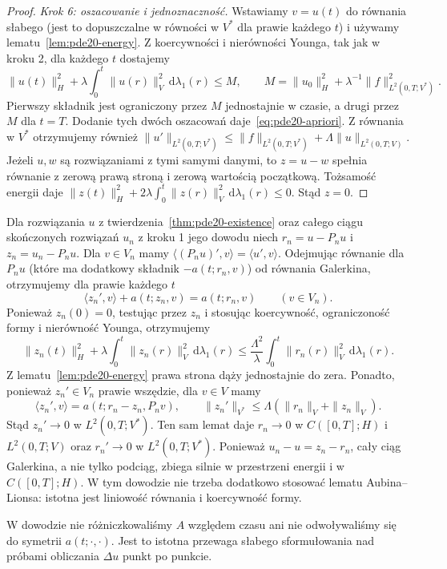 \begin{proof}
\emph{Krok 6: oszacowanie i jednoznaczność.}
Wstawiamy $v=u(t)$ do równania słabego (jest to dopuszczalne
w równości w $V^*$ dla prawie każdego $t$) i używamy
lematu~\ref{lem:pde20-energy}. Z koercywności i nierówności
Younga, tak jak w kroku 2, dla każdego $t$ dostajemy
\[
 \|u(t)\|_H^2+\lambda\int_0^t\|u(r)\|_V^2\,\mathrm d\lambda_1(r)
 \le M,\qquad
 M=\|u_0\|_H^2+\lambda^{-1}\|f\|_{L^2(0,T;V^*)}^2.
\]
Pierwszy składnik jest ograniczony przez $M$ jednostajnie
w czasie, a drugi przez $M$ dla $t=T$. Dodanie tych
dwóch oszacowań daje~\eqref{eq:pde20-apriori}.
Z równania w $V^*$ otrzymujemy również
$\|u'\|_{L^2(0,T;V^*)}\le
\|f\|_{L^2(0,T;V^*)}+\Lambda\|u\|_{L^2(0,T;V)}$.
Jeżeli $u,w$ są rozwiązaniami z tymi samymi danymi,
to $z=u-w$ spełnia równanie z zerową prawą stroną
i zerową wartością początkową. Tożsamość energii daje
$\|z(t)\|_H^2+2\lambda\int_0^t\|z(r)\|_V^2\,\mathrm d\lambda_1(r)\le0$.
Stąd $z=0$.
\end{proof}

\begin{uwaga}
Dla rozwiązania $u$ z twierdzenia~\ref{thm:pde20-existence}
oraz całego ciągu skończonych rozwiązań $u_n$
z kroku 1 jego dowodu niech $r_n=u-P_nu$
i $z_n=u_n-P_nu$.
Dla $v\in V_n$ mamy
$\langle (P_nu)',v\rangle=\langle u',v\rangle$.
Odejmując równanie dla $P_nu$ (które ma dodatkowy
składnik $-a(t;r_n,v)$) od równania Galerkina,
otrzymujemy dla prawie każdego $t$
\[
 \langle z_n',v\rangle+a(t;z_n,v)=a(t;r_n,v)
 \qquad(v\in V_n).
\]
Ponieważ $z_n(0)=0$, testując przez $z_n$ i stosując
koercywność, ograniczoność formy i nierówność Younga,
otrzymujemy
\[
 \|z_n(t)\|_H^2+\lambda\int_0^t\|z_n(r)\|_V^2\,\mathrm d\lambda_1(r)
 \le\frac{\Lambda^2}{\lambda}
 \int_0^t\|r_n(r)\|_V^2\,\mathrm d\lambda_1(r).
\]
Z lematu~\ref{lem:pde20-energy} prawa strona dąży
jednostajnie do zera. Ponadto, ponieważ $z_n'\in V_n$
prawie wszędzie, dla $v\in V$ mamy
\[
 \langle z_n',v\rangle=a(t;r_n-z_n,P_nv),
 \qquad \|z_n'\|_{V^*}\le\Lambda(\|r_n\|_V+\|z_n\|_V).
\]
Stąd $z_n'\to0$ w $L^2(0,T;V^*)$. Ten sam lemat daje
$r_n\to0$ w $C([0,T];H)$ i $L^2(0,T;V)$ oraz
$r_n'\to0$ w $L^2(0,T;V^*)$.
Ponieważ $u_n-u=z_n-r_n$, cały ciąg Galerkina,
a nie tylko podciąg, zbiega silnie w przestrzeni energii
i w $C([0,T];H)$. W tym dowodzie nie trzeba dodatkowo
stosować lematu Aubina--Lionsa: istotna jest liniowość
równania i koercywność formy.
\end{uwaga}

\begin{uwaga}
W dowodzie nie różniczkowaliśmy $A$ względem czasu
ani nie odwoływaliśmy się do symetrii $a(t;\cdot,\cdot)$.
Jest to istotna przewaga słabego sformułowania nad próbami
obliczania $\Delta u$ punkt po punkcie.
\end{uwaga}

